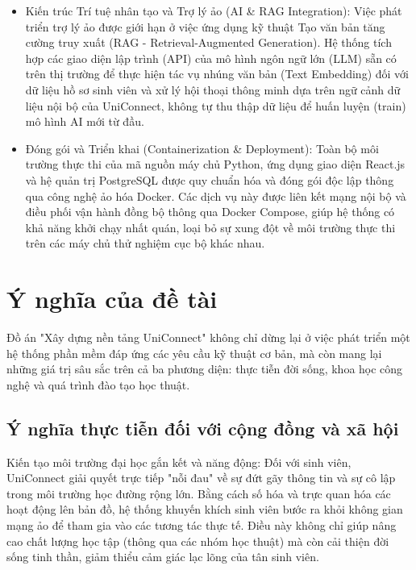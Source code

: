 \begin{itemize}
    \item Kiến trúc Trí tuệ nhân tạo và Trợ lý ảo (AI \& RAG Integration): Việc phát triển trợ lý ảo được giới hạn ở việc ứng dụng kỹ thuật Tạo văn bản tăng cường truy xuất (RAG - Retrieval-Augmented Generation)\cite{shao2024retrieval}. Hệ thống tích hợp các giao diện lập trình (API) của mô hình ngôn ngữ lớn (LLM) sẵn có trên thị trường để thực hiện tác vụ nhúng văn bản (Text Embedding) đối với dữ liệu hồ sơ sinh viên và xử lý hội thoại thông minh dựa trên ngữ cảnh dữ liệu nội bộ của UniConnect, không tự thu thập dữ liệu để huấn luyện (train) mô hình AI mới từ đầu.
    
    \item Đóng gói và Triển khai (Containerization \& Deployment): Toàn bộ môi trường thực thi của mã nguồn máy chủ Python, ứng dụng giao diện React.js và hệ quản trị PostgreSQL được quy chuẩn hóa và đóng gói độc lập thông qua công nghệ ảo hóa Docker. Các dịch vụ này được liên kết mạng nội bộ và điều phối vận hành đồng bộ thông qua Docker Compose, giúp hệ thống có khả năng khởi chạy nhất quán, loại bỏ sự xung đột về môi trường thực thi trên các máy chủ thử nghiệm cục bộ khác nhau.
\end{itemize}

\section{Ý nghĩa của đề tài}

Đồ án "Xây dựng nền tảng UniConnect" không chỉ dừng lại ở việc phát triển một hệ thống phần mềm đáp ứng các yêu cầu kỹ thuật cơ bản, mà còn mang lại những giá trị sâu sắc trên cả ba phương diện: thực tiễn đời sống, khoa học công nghệ và quá trình đào tạo học thuật.

\subsection{Ý nghĩa thực tiễn đối với cộng đồng và xã hội}

Kiến tạo môi trường đại học gắn kết và năng động: Đối với sinh viên, UniConnect giải quyết trực tiếp "nỗi đau" về sự đứt gãy thông tin và sự cô lập trong môi trường học đường rộng lớn. Bằng cách số hóa và trực quan hóa các hoạt động lên bản đồ, hệ thống khuyến khích sinh viên bước ra khỏi không gian mạng ảo để tham gia vào các tương tác thực tế\cite{hampton2003living}. Điều này không chỉ giúp nâng cao chất lượng học tập (thông qua các nhóm học thuật) mà còn cải thiện đời sống tinh thần, giảm thiểu cảm giác lạc lõng của tân sinh viên.


